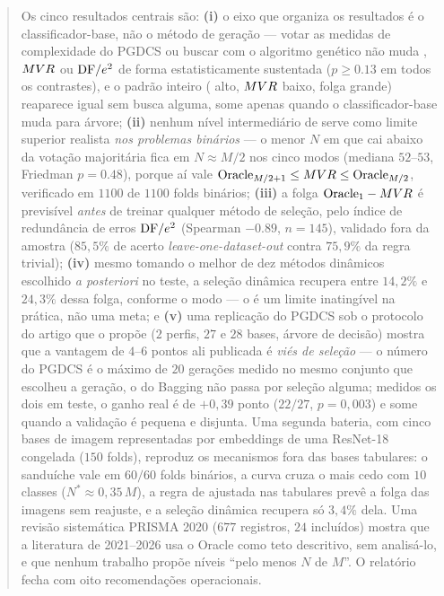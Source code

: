 \begin{abstract}
Os cinco resultados centrais são: \textbf{(i)} o eixo que organiza os resultados é
o classificador-base, não o método de geração --- votar as medidas de complexidade
do PGDCS ou buscar com o algoritmo genético não muda , $\mvr$ ou $\dfe$ de
forma estatisticamente sustentada ($p\ge0.13$ em todos os contrastes), e o padrão
inteiro ( alto, $\mvr$ baixo, folga grande) reaparece igual sem busca alguma,
some apenas quando o classificador-base muda para árvore; \textbf{(ii)} nenhum
nível intermediário de  serve como limite superior realista \emph{nos
problemas binários} --- o menor $N$ em que  cai abaixo da votação majoritária
fica em $N\approx M/2$ nos cinco modos (mediana $52$--$53$, Friedman $p=0.48$),
porque aí vale $\On{M/2+1}\le\mvr\le\On{M/2}$, verificado em $1100$ de $1100$ folds
binários; \textbf{(iii)} a folga $\On{1}-\mvr$ é previsível \emph{antes} de treinar
qualquer método de seleção, pelo índice de redundância de erros $\dfe$ (Spearman
$-0.89$, $n=145$), validado fora da amostra ($85{,}5\%$ de acerto
\emph{leave-one-dataset-out} contra $75{,}9\%$ da regra trivial); \textbf{(iv)}
mesmo tomando o melhor de dez métodos dinâmicos escolhido \emph{a posteriori} no
teste, a seleção dinâmica recupera entre $14{,}2\%$ e $24{,}3\%$ dessa folga,
conforme o modo --- o  é um limite inatingível na prática, não uma meta; e
\textbf{(v)} uma replicação do PGDCS sob o protocolo do artigo que o propõe
($2$ perfis, $27$ e $28$ bases, árvore de decisão) mostra que a vantagem de
$4$--$6$ pontos ali publicada é \emph{viés de seleção} --- o número do PGDCS é o
máximo de $20$ gerações medido no mesmo conjunto que escolheu a geração, o do
Bagging não passa por seleção alguma; medidos os dois em teste, o ganho real é de
$+0{,}39$ ponto ($22/27$, $p=0{,}003$) e some quando a validação é pequena e
disjunta. Uma segunda bateria, com cinco bases de imagem representadas por
embeddings de uma ResNet-18 congelada ($150$ folds), reproduz os mecanismos fora
das bases tabulares: o sanduíche vale em $60/60$ folds binários, a curva cruza o
\mvr{} mais cedo com $10$ classes ($N^{*}\approx0{,}35\,M$), a regra de \dfe{}
ajustada nas tabulares prevê a folga das imagens sem reajuste, e a seleção
dinâmica recupera só $3{,}4\%$ dela. Uma revisão sistemática PRISMA 2020 ($677$
registros, $24$ incluídos) mostra que a literatura de 2021--2026 usa o Oracle
como teto descritivo, sem analisá-lo, e que nenhum trabalho propõe níveis
``pelo menos $N$ de $M$''. O relatório fecha com oito recomendações operacionais.
\end{abstract}
